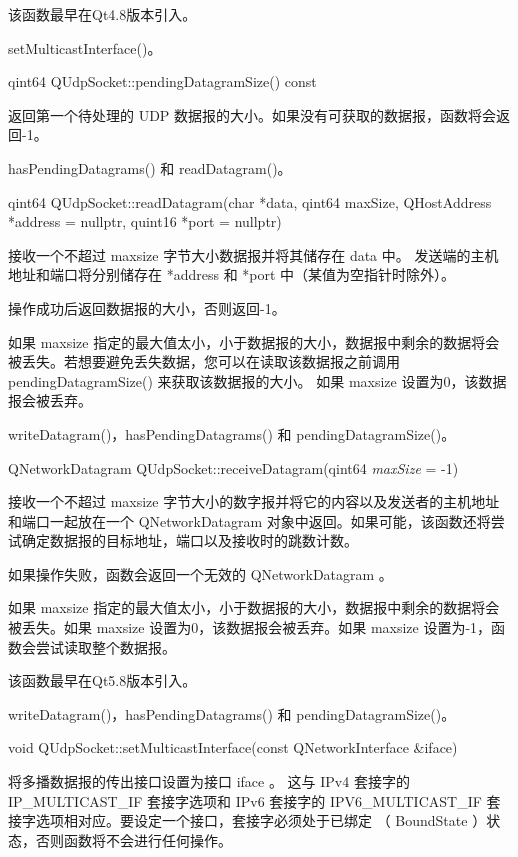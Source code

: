 该函数最早在Qt4.8版本引入。

\begin{seeAlso}
setMulticastInterface()。
\end{seeAlso}

qint64 QUdpSocket::pendingDatagramSize() const

返回第一个待处理的 UDP 数据报的大小。如果没有可获取的数据报，函数将会返回-1。

\begin{seeAlso}
hasPendingDatagrams() 和 readDatagram()。
\end{seeAlso}

qint64 QUdpSocket::readDatagram(char *data, qint64 maxSize, QHostAddress *address = nullptr, quint16 *port = nullptr)

接收一个不超过 maxsize 字节大小数据报并将其储存在 data 中。 发送端的主机地址和端口将分别储存在 *address 和 *port 中（某值为空指针时除外）。

操作成功后返回数据报的大小，否则返回-1。

如果 maxsize 指定的最大值太小，小于数据报的大小，数据报中剩余的数据将会被丢失。若想要避免丢失数据，您可以在读取该数据报之前调用 pendingDatagramSize() 来获取该数据报的大小。 如果 maxsize 设置为0，该数据报会被丢弃。

\begin{seeAlso}
writeDatagram()，hasPendingDatagrams() 和 pendingDatagramSize()。
\end{seeAlso}

QNetworkDatagram QUdpSocket::receiveDatagram(qint64 \emph{maxSize} = -1)

接收一个不超过 maxsize 字节大小的数字报并将它的内容以及发送者的主机地址和端口一起放在一个 QNetworkDatagram 对象中返回。如果可能，该函数还将尝试确定数据报的目标地址，端口以及接收时的跳数计数。

如果操作失败，函数会返回一个无效的 QNetworkDatagram 。

如果 maxsize 指定的最大值太小，小于数据报的大小，数据报中剩余的数据将会被丢失。如果 maxsize 设置为0，该数据报会被丢弃。如果 maxsize 设置为-1，函数会尝试读取整个数据报。

该函数最早在Qt5.8版本引入。

\begin{seeAlso}
writeDatagram()，hasPendingDatagrams() 和 pendingDatagramSize()。
\end{seeAlso}

void QUdpSocket::setMulticastInterface(const QNetworkInterface \&iface)

将多播数据报的传出接口设置为接口 iface 。 这与 IPv4 套接字的 IP\_MULTICAST\_IF 套接字选项和 IPv6 套接字的 IPV6\_MULTICAST\_IF 套接字选项相对应。要设定一个接口，套接字必须处于已绑定 （ BoundState ）状态，否则函数将不会进行任何操作。

